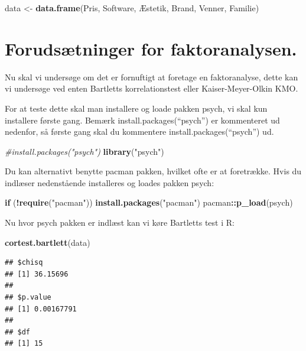 \documentclass[]{book}
\newenvironment{Shaded}{\begin{snugshade}}{\end{snugshade}}
\newcommand{\CommentTok}[1]{\textcolor[rgb]{0.56,0.35,0.01}{\textit{#1}}}
\newcommand{\ControlFlowTok}[1]{\textcolor[rgb]{0.13,0.29,0.53}{\textbf{#1}}}
\newcommand{\KeywordTok}[1]{\textcolor[rgb]{0.13,0.29,0.53}{\textbf{#1}}}
\newcommand{\NormalTok}[1]{#1}
\newcommand{\OperatorTok}[1]{\textcolor[rgb]{0.81,0.36,0.00}{\textbf{#1}}}
\newcommand{\StringTok}[1]{\textcolor[rgb]{0.31,0.60,0.02}{#1}}
\begin{document}
\begin{Shaded}
\begin{Highlighting}[]
\NormalTok{data <-}\StringTok{ }\KeywordTok{data.frame}\NormalTok{(Pris, Software, Æstetik, Brand, Venner, Familie)}
\end{Highlighting}
\end{Shaded}

\hypertarget{forudstninger-for-faktoranalysen.}{%
\section{Forudsætninger for faktoranalysen.}\label{forudstninger-for-faktoranalysen.}}

Nu skal vi undersøge om det er fornuftigt at foretage en faktoranalyse, dette kan vi undersøge ved enten Bartletts korrelationstest eller Kaiser-Meyer-Olkin KMO.

For at teste dette skal man installere og loade pakken psych, vi skal kun installere første gang. Bemærk install.packages(``psych'') er kommenteret ud nedenfor, så første gang skal du kommentere install.packages(``psych'') ud.

\begin{Shaded}
\begin{Highlighting}[]
\CommentTok{#install.packages("psych")}
\KeywordTok{library}\NormalTok{(}\StringTok{"psych"}\NormalTok{)}
\end{Highlighting}
\end{Shaded}

Du kan alternativt benytte pacman pakken, hvilket ofte er at foretrække. Hvis du indlæser nedenstående installeres og loades pakken psych:

\begin{Shaded}
\begin{Highlighting}[]
\ControlFlowTok{if}\NormalTok{ (}\OperatorTok{!}\KeywordTok{require}\NormalTok{(}\StringTok{"pacman"}\NormalTok{)) }\KeywordTok{install.packages}\NormalTok{(}\StringTok{"pacman"}\NormalTok{)}
\NormalTok{pacman}\OperatorTok{::}\KeywordTok{p_load}\NormalTok{(psych)}
\end{Highlighting}
\end{Shaded}

Nu hvor psych pakken er indlæst kan vi køre Bartletts test i R:

\begin{Shaded}
\begin{Highlighting}[]
\KeywordTok{cortest.bartlett}\NormalTok{(data)}
\end{Highlighting}
\end{Shaded}

\begin{verbatim}
## $chisq
## [1] 36.15696
## 
## $p.value
## [1] 0.00167791
## 
## $df
## [1] 15
\end{verbatim}
\end{document}
